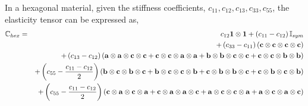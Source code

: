In a hexagonal material, given the stiffness coefficients,
$c_{11},c_{12},c_{13},c_{33},c_{55}$, the elasticity tensor can
be expressed as,
\begin{eqnarray}
\mathbb{C}_{hex}  &=&                   c_{12}        \mathbf{1}\otimes\mathbf{1}
                + \left( c_{11} - c_{12} \right)\mathbb{I}_{sym}
                                                    \nonumber\\
            & & + \left( c_{33} - c_{11} \right)
                  \left(   \mathbf{c} \otimes \mathbf{c} \otimes \mathbf{c} \otimes \mathbf{c} \right)
                                                    \nonumber\\
            & & + \left( c_{13} - c_{12} \right)
                  \left(   \mathbf{a} \otimes \mathbf{a} \otimes \mathbf{c} \otimes \mathbf{c}
                         + \mathbf{c} \otimes \mathbf{c} \otimes \mathbf{a} \otimes \mathbf{a}
                         + \mathbf{b} \otimes \mathbf{b} \otimes \mathbf{c} \otimes \mathbf{c}
                         + \mathbf{c} \otimes \mathbf{c} \otimes \mathbf{b} \otimes \mathbf{b} \right)
                                                     \nonumber\\
            & & + \left( c_{55} - \frac{c_{11}-c_{12}}{2} \right)
                  \left(   \mathbf{b} \otimes \mathbf{c} \otimes \mathbf{b} \otimes \mathbf{c}
                         + \mathbf{b} \otimes \mathbf{c} \otimes \mathbf{c} \otimes \mathbf{b}
                         + \mathbf{c} \otimes \mathbf{b} \otimes \mathbf{b} \otimes \mathbf{c}
                         + \mathbf{c} \otimes \mathbf{b} \otimes \mathbf{c} \otimes \mathbf{b} \right)
                                                     \nonumber\\
            & & + \left( c_{55} - \frac{c_{11}-c_{12}}{2} \right)
                  \left(   \mathbf{c} \otimes \mathbf{a} \otimes \mathbf{c} \otimes \mathbf{a}
                         + \mathbf{c} \otimes \mathbf{a} \otimes \mathbf{a} \otimes \mathbf{c}
                         + \mathbf{a} \otimes \mathbf{c} \otimes \mathbf{c} \otimes \mathbf{a}
                         + \mathbf{a} \otimes \mathbf{c} \otimes \mathbf{a} \otimes \mathbf{c} \right)
                                                     \nonumber
\end{eqnarray}


\clearpage
